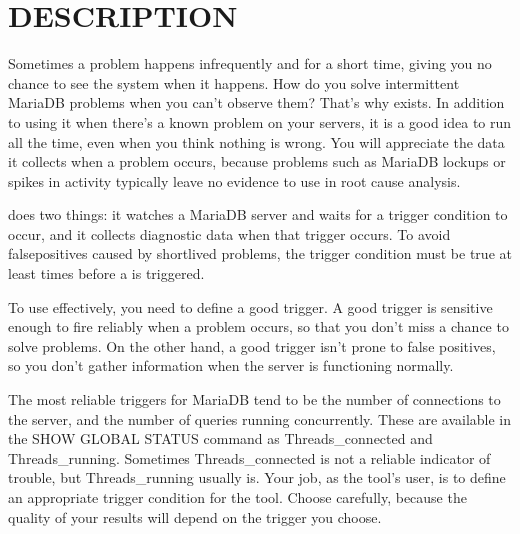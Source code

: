 \documentclass[letterpaper,10pt,english]{sphinxmanual}
\begin{document}
\section{DESCRIPTION}
\label{\detokenize{mariadb-stat:description}}
\sphinxAtStartPar
Sometimes a problem happens infrequently and for a short time, giving you no
chance to see the system when it happens. How do you solve intermittent MariaDB
problems when you can’t observe them? That’s why  exists. In addition to
using it when there’s a known problem on your servers, it is a good idea to run
 all the time, even when you think nothing is wrong.  You will
appreciate the data it collects when a problem occurs, because problems such as
MariaDB lockups or spikes in activity typically leave no evidence to use in root
cause analysis.

\sphinxAtStartPar
{} does two things: it watches a MariaDB server and waits for a trigger
condition to occur, and it collects diagnostic data when that trigger occurs.
To avoid false\sphinxhyphen{}positives caused by short\sphinxhyphen{}lived problems, the trigger condition
must be true at least {\hyperref[\detokenize{mariadb-stat:cmdoption-mariadb-stat-cycles}]{}} times before a {\hyperref[\detokenize{mariadb-stat:cmdoption-mariadb-stat-collect}]{}} is triggered.

\sphinxAtStartPar
To use  effectively, you need to define a good trigger.  A good trigger
is sensitive enough to fire reliably when a problem occurs, so that you don’t
miss a chance to solve problems.  On the other hand, a good trigger isn’t
prone to false positives, so you don’t gather information when the server
is functioning normally.

\sphinxAtStartPar
The most reliable triggers for MariaDB tend to be the number of connections to the
server, and the number of queries running concurrently. These are available in
the SHOW GLOBAL STATUS command as Threads\_connected and Threads\_running.
Sometimes Threads\_connected is not a reliable indicator of trouble, but
Threads\_running usually is.  Your job, as the tool’s user, is to define an
appropriate trigger condition for the tool.  Choose carefully, because the
quality of your results will depend on the trigger you choose.
\end{document}

